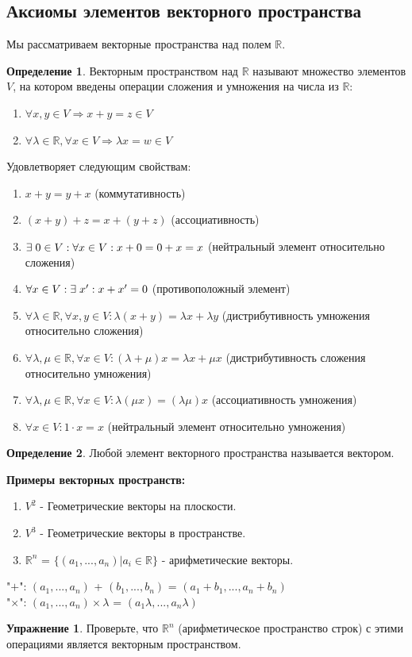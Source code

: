 \documentclass[a4paper, 12pt]{article}
\newcommand{\R}{\mathbb R}
\newcommand\tab[1][.5cm]{\hspace*{#1}}
\theoremstyle{definition}
\newtheorem*{definition}{Определение}
\newtheorem*{Exercise}{Упражнение}
\begin{document}
  \subsection{Аксиомы элементов векторного пространства}
  Мы рассматриваем векторные пространства над полем $\R$.
  \begin{definition}
    Векторным пространством над $\R$ называют множество элементов $V$, на котором введены операции сложения и умножения на числа из $\R$:
    \begin{enumerate}
      \item $ \forall x,y \in V \Longrightarrow x+y=z \in V$
      \item $\forall \lambda \in \R, \forall x \in V \Longrightarrow \lambda x = w \in V$ 
    \end{enumerate}
    Удовлетворяет следующим свойствам:
    \begin{enumerate}
      \item $x+y = y+x$ (коммутативность)
      \item $(x+y)+z = x+(y+z)$ (ассоциативность)
      \item $\exists \tab[0.1cm] 0 \in V: \forall x \in V: x+0 = 0+x = x$ (нейтральный элемент относительно сложения)
      \item $\forall x \in V: \exists \tab[0.1cm] x^{\prime}: x + x^{\prime} = 0$ (противоположный элемент)
      \item $\forall \lambda \in \R, \forall x,y \in V: \lambda (x+y) = \lambda x + \lambda y$ (дистрибутивность умножения относительно сложения)
      \item $\forall \lambda, \mu \in \R, \forall x \in V: (\lambda+\mu)x = \lambda x + \mu x $ (дистрибутивность сложения относительно умножения)
      \item $\forall \lambda, \mu \in \R, \forall x \in V: \lambda(\mu x) = (\lambda \mu) x $ (ассоциативность умножения)
      \item $\forall x \in V: 1 \cdot x = x$ (нейтральный элемент относительно умножения)
    \end{enumerate}
  \end{definition} 

  \begin{definition}
    Любой элемент векторного пространства называется вектором.
  \end{definition} 

  \textbf{Примеры векторных пространств:} 
    \begin{enumerate} 
      \item $V^2$ - Геометрические векторы на плоскости.
      \item $V^3$ - Геометрические векторы в пространстве.
      \item $\R^n$ = $\{ {(a_1,...,a_n) | a_i \in \R} \}$ - арифметические векторы.
    \end{enumerate}
    \tab[0.8cm]"$+$": $(a_1,...,a_n)$ + $(b_1,...,b_n)$ = $(a_1+b_1,...,a_n+b_n)$ \\
    \tab[0.8cm]"$\times$": $(a_1,...,a_n) \times \lambda$ = $(a_1\lambda,...,a_n\lambda)$ 
  \begin{Exercise}
    Проверьте, что $\R^n$ (арифметическое пространство строк) с этими операциями является векторным пространством. 
  \end{Exercise}  
\end{document}
